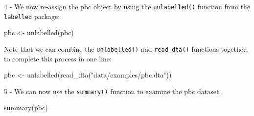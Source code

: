 \documentclass[
]{memoir}
\newenvironment{Shaded}{\begin{snugshade}}{\end{snugshade}}
\newcommand{\FunctionTok}[1]{\textcolor[rgb]{0.00,0.00,0.00}{#1}}
\newcommand{\NormalTok}[1]{#1}
\newcommand{\OtherTok}[1]{\textcolor[rgb]{0.56,0.35,0.01}{#1}}
\newcommand{\StringTok}[1]{\textcolor[rgb]{0.31,0.60,0.02}{#1}}
\begin{document}
4 - We now re-assign the pbc object by using the \texttt{unlabelled()} function from the \texttt{labelled} package:

\begin{Shaded}
\begin{Highlighting}[]
\NormalTok{pbc }\OtherTok{\textless{}{-}} \FunctionTok{unlabelled}\NormalTok{(pbc)}
\end{Highlighting}
\end{Shaded}

Note that we can combine the \texttt{unlabelled()} and \texttt{read\_dta()} functions together, to complete this process in one line:

\begin{Shaded}
\begin{Highlighting}[]
\NormalTok{pbc }\OtherTok{\textless{}{-}} \FunctionTok{unlabelled}\NormalTok{(}\FunctionTok{read\_dta}\NormalTok{(}\StringTok{"data/examples/pbc.dta"}\NormalTok{))}
\end{Highlighting}
\end{Shaded}

5 - We can now use the \texttt{summary()} function to examine the pbc dataset.

\begin{Shaded}
\begin{Highlighting}[]
\FunctionTok{summary}\NormalTok{(pbc)}
\end{Highlighting}
\end{Shaded}
\end{document}
